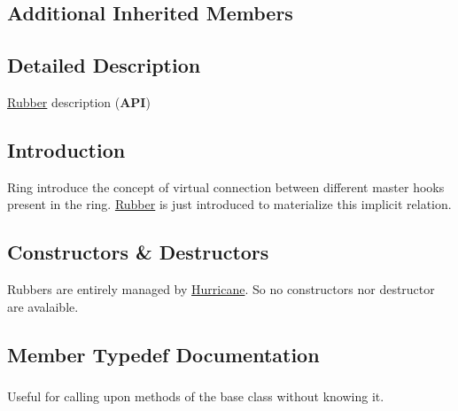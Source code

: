 \subsection*{Additional Inherited Members}


\subsection{Detailed Description}
\hyperlink{classHurricane_1_1Rubber}{Rubber} description ({\bfseries A\-P\-I}) 

\hypertarget{classHurricane_1_1Rubber_secRubberIntro}{}\subsection{Introduction}\label{classHurricane_1_1Rubber_secRubberIntro}
Ring introduce the concept of virtual connection between different master hooks present in the ring. \hyperlink{classHurricane_1_1Rubber}{Rubber} is just introduced to materialize this implicit relation.\hypertarget{classHurricane_1_1Rubber_secRubberConstructors}{}\subsection{Constructors \& Destructors}\label{classHurricane_1_1Rubber_secRubberConstructors}
Rubbers are entirely managed by \hyperlink{namespaceHurricane}{Hurricane}. So no constructors nor destructor are avalaible. 

\subsection{Member Typedef Documentation}
\hypertarget{classHurricane_1_1Rubber_aa74649cee7cda714020e77194af2210a}{
\subsubsection[{Inherit}]{}}\label{classHurricane_1_1Rubber_aa74649cee7cda714020e77194af2210a}
Useful for calling upon methods of the base class without knowing it. 

